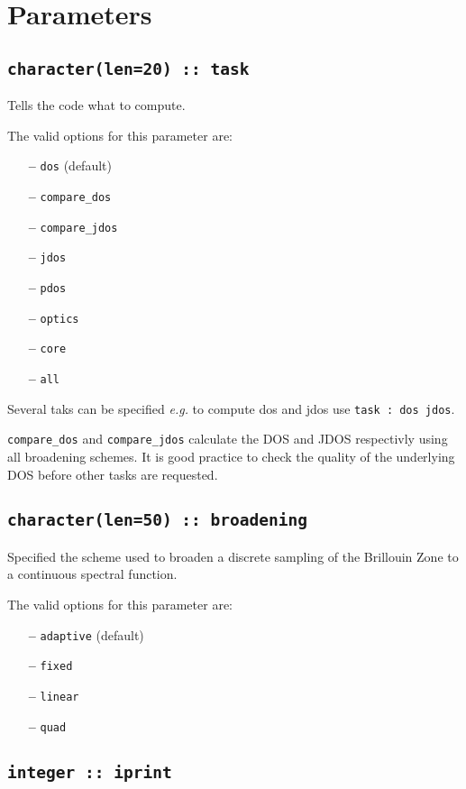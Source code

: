 \documentclass[a4paper,11pt,twoside]{book}
\begin{document}
\clearpage


\section{Parameters}
\subsection[task]{\tt character(len=20) :: task}

Tells the code what to compute. 

The valid options for this parameter are:
\begin{itemize}
\item[{\bf --}]  \verb#dos# (default)
\item[{\bf --}]  \verb#compare_dos#
\item[{\bf --}]  \verb#compare_jdos#
\item[{\bf --}]  \verb#jdos#
\item[{\bf --}]  \verb#pdos#
\item[{\bf --}]  \verb#optics#
\item[{\bf --}]  \verb#core#
\item[{\bf --}]  \verb#all#
\end{itemize}
Several taks can be specified \emph{e.g.} to compute dos and jdos use
\verb#task : dos jdos#.  

\verb#compare_dos# and \verb#compare_jdos# calculate the DOS and JDOS respectivly using all broadening schemes. It is good practice to check the quality of the underlying DOS before other tasks are requested. 

\subsection[broadening]{\tt character(len=50) :: broadening}

Specified the scheme used to broaden a discrete sampling of the
Brillouin Zone to a continuous spectral function.

The valid options for this parameter are:
\begin{itemize}
\item[{\bf --}]  \verb#adaptive# (default)
\item[{\bf --}]  \verb#fixed#
\item[{\bf --}]  \verb#linear#
\item[{\bf --}]  \verb#quad#
\end{itemize}

\subsection[iprint]{\tt integer :: iprint}
\end{document}
